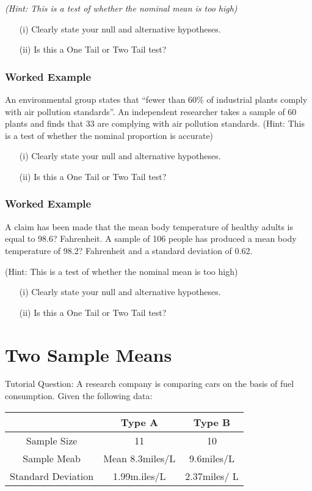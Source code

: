 \documentclass[]{report}
\begin{document}
{	\textit{(Hint: This is a test of whether the nominal mean is too high)}
	
	\begin{itemize}
		\item[(i)] Clearly state your null and alternative hypotheses.
		\item[(ii)] Is this a One Tail or Two Tail test?
	\end{itemize}
	\subsubsection{Worked Example}
	An environmental group states that “fewer than 60\% of industrial plants comply with air pollution standards”. An independent researcher takes a sample of 60 plants and finds that 33 are complying with air pollution standards. 
	(Hint: This is a test of whether the nominal proportion is accurate)
	\begin{itemize}
		\item[(i)] Clearly state your null and alternative hypotheses.
		\item[(ii)] Is this a One Tail or Two Tail test?
	\end{itemize}
	
	\subsubsection{Worked Example}	
	A claim has been made that the mean body temperature of healthy adults is equal to 98.6? Fahrenheit. A sample of 106 people has produced a mean body temperature of 98.2? Fahrenheit and a standard deviation of 0.62. 
	
	(Hint: This is a test of whether the nominal mean is too high)
	\begin{itemize}
		\item[(i)] Clearly state your null and alternative hypotheses.
		\item[(ii)] Is this a One Tail or Two Tail test?
	\end{itemize}



\section{Two Sample Means}
Tutorial Question: 
A research company is comparing cars on the basis of fuel consumption.
Given the following data:
\begin{center}
	\begin{tabular}{|c|c|c|} \hline
		&	Type A	&	Type B	\\	\hline
		Sample Size	&	11	&	10	\\	\hline
		Sample Meab	&	Mean 8.3miles/L	&	9.6miles/L	\\	\hline
		Standard Deviation 	&	1.99m.iles/L	&	2.37miles/ L	\\	\hline
	\end{tabular} 
	

\end{center}}
\end{document}
